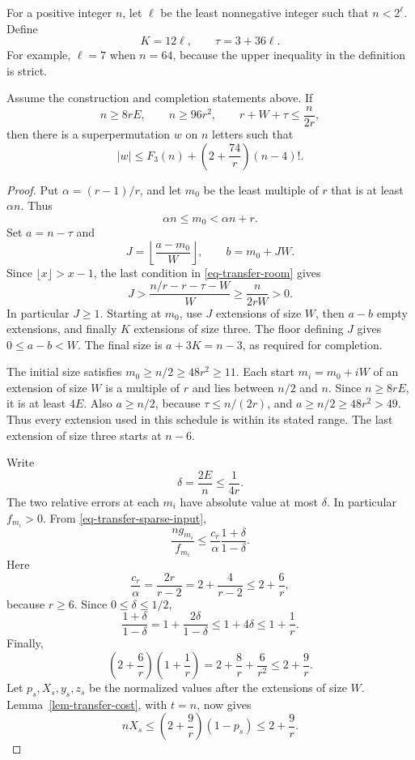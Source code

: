 For a positive integer $n$, let $\ell$ be the least nonnegative integer
such that $n<2^\ell$. Define
\[
 K=12\ell,\qquad \tau=3+36\ell.
\]
For example, $\ell=7$ when $n=64$, because the upper inequality in the
definition is strict.

\begin{theorem}\label{thm-transfer-finite}
Assume the construction and completion statements above. If
\begin{equation}
 n\ge8rE,\qquad n\ge96r^2,\qquad
 r+W+\tau\le\frac{n}{2r},
 \label{eq-transfer-room}
\end{equation}
then there is a superpermutation $w$ on $n$ letters such that
\[
 |w|\le F_3(n)+\left(2+\frac{74}{r}\right)(n-4)!.
\]
\end{theorem}

\begin{proof}
Put $\alpha=(r-1)/r$, and let $m_0$ be the least multiple of $r$
that is at least $\alpha n$. Thus
\[
 \alpha n\le m_0<\alpha n+r.
\]
Set $a=n-\tau$ and
\[
 J=\left\lfloor\frac{a-m_0}{W}\right\rfloor,
 \qquad b=m_0+JW.
\]
Since $\lfloor x\rfloor>x-1$, the last condition in
\eqref{eq-transfer-room} gives
\[
 J>\frac{n/r-r-\tau-W}{W}
 \ge\frac{n}{2rW}>0.
\]
In particular $J\ge1$. Starting at $m_0$, use $J$ extensions of size
$W$, then $a-b$ empty extensions, and finally $K$ extensions of size
three. The floor defining $J$ gives $0\le a-b<W$. The final size is
$a+3K=n-3$, as required for completion.

The initial size satisfies $m_0\ge n/2\ge48r^2\ge11$. Each start
$m_i=m_0+iW$ of an extension of size $W$ is a multiple of
$r$ and lies between $n/2$ and $n$. Since $n\ge8rE$, it is at least
$4E$. Also $a\ge n/2$, because $\tau\le n/(2r)$, and
$a\ge n/2\ge48r^2>49$. Thus every extension used in this schedule
is within its stated range. The last extension of size three starts at
$n-6$.

Write
\[
 \delta=\frac{2E}{n}\le\frac1{4r}.
\]
The two relative errors at each $m_i$ have absolute value at most
$\delta$. In particular $f_{m_i}>0$. From
\eqref{eq-transfer-sparse-input},
\[
 \frac{ng_{m_i}}{f_{m_i}}
 \le\frac{c_r}{\alpha}\frac{1+\delta}{1-\delta}.
\]
Here
\[
 \frac{c_r}{\alpha}=\frac{2r}{r-2}
 =2+\frac4{r-2}\le2+\frac6r,
\]
because $r\ge6$. Since $0\le\delta\le1/2$,
\[
 \frac{1+\delta}{1-\delta}
 =1+\frac{2\delta}{1-\delta}
 \le1+4\delta\le1+\frac1r.
\]
Finally,
\[
 \left(2+\frac6r\right)\left(1+\frac1r\right)
 =2+\frac8r+\frac6{r^2}
 \le2+\frac9r.
\]
Let $p_s,X_s,y_s,z_s$ be the normalized values after the extensions of
size $W$. Lemma~\ref{lem-transfer-cost}, with $t=n$, now gives
\begin{equation}
 nX_s\le\left(2+\frac9r\right)(1-p_s)
 \le2+\frac9r.
 \label{eq-transfer-sparse-cost}
\end{equation}


\end{proof}
